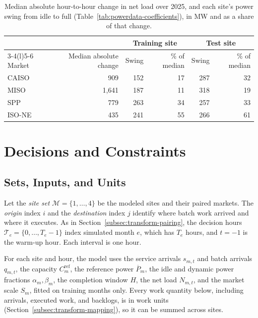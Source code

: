 \documentclass{UNCC-thesis}
\begin{document}
\begin{table}[htbp]
  \centering
  \footnotesize
  \caption{Median absolute hour-to-hour change in net load over 2025, and
  each site's power swing from idle to full
  (Table~\ref{tab:powerdata-coefficients}), in MW and as a share of that
  change.}
  \label{tab:native-ramp-scale}
  \begin{tabular}{@{}lrrrrr@{}}
    \toprule
    & & \multicolumn{2}{c}{Training site} & \multicolumn{2}{c}{Test site} \\
    \cmidrule(lr){3-4}\cmidrule(l){5-6}
    Market & Median absolute change & Swing & \% of median & Swing & \% of median \\
    \midrule
    CAISO          & 909   & 152 & 17 & 287 & 32 \\
    MISO           & 1,641 & 187 & 11 & 318 & 19 \\
    SPP            & 779   & 263 & 34 & 257 & 33 \\
    ISO-NE         & 435   & 241 & 55 & 266 & 61 \\
    \bottomrule
  \end{tabular}
\end{table}


\section{Decisions and Constraints}
\label{sec:problem-statement}

\subsection{Sets, Inputs, and Units}
\label{subsec:problem-given-inputs}

Let the \emph{site set} \(\mathcal M=\{1,\ldots,4\}\) be the modeled sites
and their paired markets. The \emph{origin} index \(i\) and the
\emph{destination} index \(j\) identify where batch work arrived and where it
executes. As in Section~\ref{subsec:transform-pairing}, the decision hours
\(\mathcal T_e=\{0,\ldots,T_e-1\}\) index simulated month \(e\), which has
\(T_e\) hours, and \(t=-1\) is the warm-up hour. Each interval
is one hour. 

For each site and hour, the model uses the service arrivals \(s_{m,t}\) and
batch arrivals \(q_{m,t}\), the capacity \(C^{\mathrm{ref}}_m\), the reference power
\(\overline P_m\), the idle and dynamic power fractions \(\alpha_m,\beta_m\),
the completion window \(H\), the net load \(N_{m,t}\), and the market
scale \(S_m\), fitted on training months only. Every work quantity below, including
arrivals, executed work, and backlogs, is in work units
(Section~\ref{subsec:transform-mapping}), so it can be summed across sites.
\end{document}
